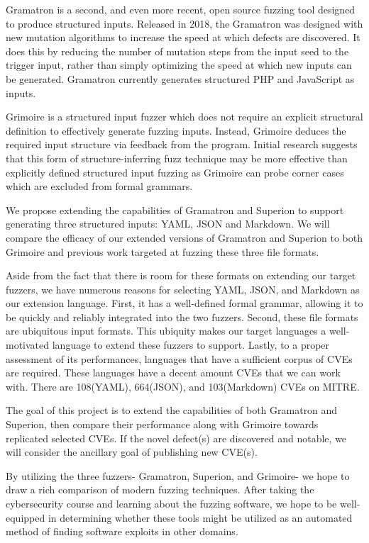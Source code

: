 \documentclass[12pt]{diazessay}
\begin{document}
Gramatron\cite{srivastava2021gramatron} is a second, and even more recent, open source fuzzing tool designed to produce structured inputs.
Released in 2018, the Gramatron was designed with new mutation algorithms to increase the speed at which defects are discovered.
It does this by reducing the number of mutation steps from the input seed to the trigger input, rather than simply optimizing the speed at which new inputs can be generated.
Gramatron currently generates structured PHP and JavaScript as inputs.

Grimoire\cite{GRIMOIRE} is a structured input fuzzer which does not require an explicit structural definition to effectively generate fuzzing inputs.
Instead, Grimoire deduces the required input structure via feedback from the program.
Initial research suggests that this form of structure-inferring fuzz technique may be more effective than explicitly defined structured input fuzzing as Grimoire can probe corner cases which are excluded from formal grammars.

We propose extending the capabilities of Gramatron and Superion to support generating three structured inputs: YAML\cite{YAMLdraft}, JSON and Markdown.
We will compare the efficacy of our extended versions of Gramatron and Superion to both Grimoire and previous work targeted at fuzzing these three file formats.

Aside from the fact that there is room for these formats on extending our target fuzzers, we have numerous reasons for selecting YAML, JSON, and Markdown as our extension language.
First, it has a well-defined formal grammar, allowing it to be quickly and reliably integrated into the two fuzzers.
Second, these file formats are ubiquitous input formats.
This ubiquity makes our target languages a well-motivated language to extend these fuzzers to support.
Lastly, to a proper assessment of its performances, languages that have a sufficient corpus of CVEs are required. 
These languages have a decent amount CVEs that we can work with.
There are 108(YAML), 664(JSON), and 103(Markdown) CVEs on MITRE\cite{MITRE}.

The goal of this project is to extend the capabilities of both Gramatron and Superion, then compare their performance along with Grimoire towards replicated selected CVEs.
If the novel defect(s) are discovered and notable, we will consider the ancillary goal of publishing new CVE(s).

By utilizing the three fuzzers- Gramatron, Superion, and Grimoire- we hope to draw a rich comparison of modern fuzzing techniques.
After taking the cybersecurity course and learning about the fuzzing software, we hope to be well-equipped in determining whether these tools might be utilized as an automated method of finding software exploits in other domains.
\end{document}
